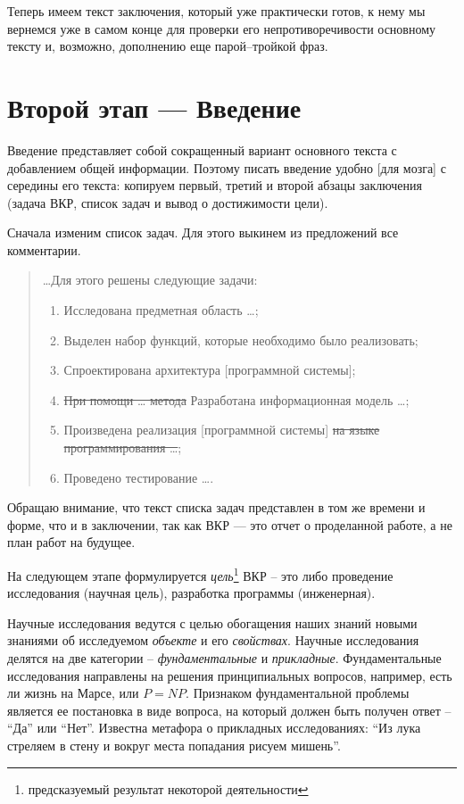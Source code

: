 \documentclass[a4paper,14pt,final]{extreport}
\begin{document}
Теперь имеем текст заключения, который уже практически готов, к нему мы вернемся уже в самом конце для проверки его непротиворечивости основному тексту и, возможно, дополнению еще парой--тройкой фраз.

\section{Второй этап --- Введение}
\label{sec:intro}

Введение представляет собой сокращенный вариант основного текста с добавлением общей информации.  Поэтому писать введение удобно [для мозга] с середины его текста: копируем первый, третий и второй абзацы заключения (задача ВКР, список задач и вывод о достижимости цели).

Сначала изменим список задач.  Для этого выкинем из предложений все комментарии.
\begin{quote}
\ldots Для этого решены следующие задачи:
\begin{enumerate}
\item Исследована предметная область \ldots{};
\item Выделен набор функций, которые необходимо было реализовать;
\item Спроектирована архитектура [программной системы];
\item \sout{При помощи \ldots{} метода} Разработана информационная модель \ldots{};
\item Произведена реализация [программной системы] \sout{на языке программирования \ldots{}};
\item Проведено тестирование \ldots{}.
\end{enumerate}
\end{quote}
Обращаю внимание, что текст списка задач представлен в том же времени и форме, что и в заключении, так как ВКР --- это отчет о проделанной работе, а не план работ на будущее.

На следующем этапе формулируется \emph{цель}\footnote{предсказуемый результат некоторой деятельности} ВКР -- это либо проведение исследования (научная цель), разработка программы (инженерная).

Научные исследования ведутся с целью обогащения наших знаний новыми знаниями об исследуемом \emph{объекте} и его \emph{свойствах}.  Научные исследования делятся на две категории -- \emph{фундаментальные} и \emph{прикладные}.  Фундаментальные исследования направлены на решения принципиальных вопросов, например, есть ли жизнь на Марсе, или $P=NP$.  Признаком фундаментальной проблемы является ее постановка в виде вопроса, на который должен быть получен ответ -- ``Да'' или ``Нет''.  Известна метафора о прикладных исследованиях: ``Из лука стреляем в стену и вокруг места попадания рисуем мишень''.
\end{document}
